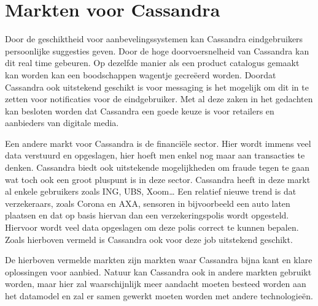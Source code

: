 \section{Markten voor Cassandra}
Door de geschiktheid voor aanbevelingssystemen kan Cassandra eindgebruikers persoonlijke suggesties geven.
Door de hoge doorvoersnelheid van Cassandra kan dit real time gebeuren.
Op dezelfde manier als een product catalogus gemaakt kan worden kan een boodschappen wagentje gecreëerd worden.
Doordat Cassandra ook uitstekend geschikt is voor messaging is het mogelijk om dit in te zetten voor notificaties voor de eindgebruiker.
Met al deze zaken in het gedachten kan besloten worden dat Cassandra een goede keuze is voor retailers en aanbieders van digitale media.

Een andere markt voor Cassandra is de financiële sector.
Hier wordt immens veel data verstuurd en opgeslagen, hier hoeft men enkel nog maar aan transacties te denken.
Cassandra biedt ook uitstekende mogelijkheden om fraude tegen te gaan wat toch ook een groot pluspunt is in deze sector.
Cassandra heeft in deze markt al enkele gebruikers zoals ING, UBS, Xoom\dots
Een relatief nieuwe trend is dat verzekeraars, zoals Corona en AXA, sensoren in bijvoorbeeld een auto laten plaatsen en dat op basis hiervan dan een verzekeringspolis wordt opgesteld.
Hiervoor wordt veel data opgeslagen om deze polis correct te kunnen bepalen.
Zoals hierboven vermeld is Cassandra ook voor deze job uitstekend geschikt.

De hierboven vermelde markten zijn markten waar Cassandra bijna kant en klare oplossingen voor aanbied.
Natuur kan Cassandra ook in andere markten gebruikt worden, maar hier zal waarschijnlijk meer aandacht moeten besteed worden aan het datamodel en zal er samen gewerkt moeten worden met andere technologieën.